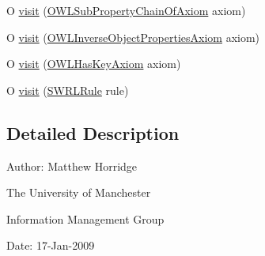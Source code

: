 \begin{DoxyCompactItemize}
\item 
O \hyperlink{interfaceorg_1_1semanticweb_1_1owlapi_1_1model_1_1_o_w_l_logical_axiom_visitor_ex_3_01_o_01_4_a36ffb5af9bfacd8bd2ab7fc93efd5b63}{visit} (\hyperlink{interfaceorg_1_1semanticweb_1_1owlapi_1_1model_1_1_o_w_l_sub_property_chain_of_axiom}{O\-W\-L\-Sub\-Property\-Chain\-Of\-Axiom} axiom)
\item 
O \hyperlink{interfaceorg_1_1semanticweb_1_1owlapi_1_1model_1_1_o_w_l_logical_axiom_visitor_ex_3_01_o_01_4_ae340a16dff2e4b88481021c520b15f6c}{visit} (\hyperlink{interfaceorg_1_1semanticweb_1_1owlapi_1_1model_1_1_o_w_l_inverse_object_properties_axiom}{O\-W\-L\-Inverse\-Object\-Properties\-Axiom} axiom)
\item 
O \hyperlink{interfaceorg_1_1semanticweb_1_1owlapi_1_1model_1_1_o_w_l_logical_axiom_visitor_ex_3_01_o_01_4_aeab37d1264ae2823d768522aaab295bd}{visit} (\hyperlink{interfaceorg_1_1semanticweb_1_1owlapi_1_1model_1_1_o_w_l_has_key_axiom}{O\-W\-L\-Has\-Key\-Axiom} axiom)
\item 
O \hyperlink{interfaceorg_1_1semanticweb_1_1owlapi_1_1model_1_1_o_w_l_logical_axiom_visitor_ex_3_01_o_01_4_a5d59a219a23744af4b413f2fe540b51c}{visit} (\hyperlink{interfaceorg_1_1semanticweb_1_1owlapi_1_1model_1_1_s_w_r_l_rule}{S\-W\-R\-L\-Rule} rule)
\end{DoxyCompactItemize}


\subsection{Detailed Description}
Author\-: Matthew Horridge\par
 The University of Manchester\par
 Information Management Group\par
 Date\-: 17-\/\-Jan-\/2009 

